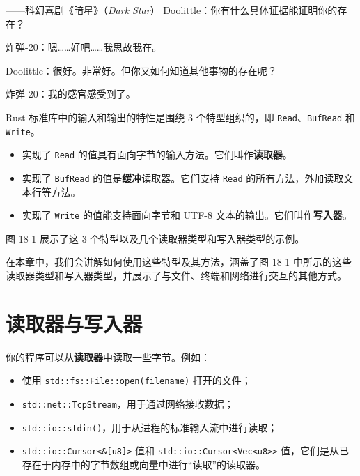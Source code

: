 
\begin{myEpigraph}{——科幻喜剧《暗星》（\emph{Dark Star}）}
Doolittle：你有什么具体证据能证明你的存在？

炸弹-20：嗯……好吧……我思故我在。

Doolittle：很好。非常好。但你又如何知道其他事物的存在呢？

炸弹-20：我的感官感受到了。
\end{myEpigraph}

Rust 标准库中的输入和输出的特性是围绕 3 个特型组织的，即 \texttt{Read}、\texttt{BufRead} 和 \texttt{Write}。

\begin{itemize}
\item 实现了 \texttt{Read} 的值具有面向字节的输入方法。它们叫作\textbf{读取器}。
\item 实现了 \texttt{BufRead} 的值是\textbf{缓冲}读取器。它们支持 \texttt{Read} 的所有方法，外加读取文本行等方法。
\item 实现了 \texttt{Write} 的值能支持面向字节和 UTF-8 文本的输出。它们叫作\textbf{写入器}。
\end{itemize}

图 18-1 展示了这 3 个特型以及几个读取器类型和写入器类型的示例。


在本章中，我们会讲解如何使用这些特型及其方法，涵盖了图 18-1 中所示的这些读取器类型和写入器类型，并展示了与文件、终端和网络进行交互的其他方式。

\section{读取器与写入器}

你的程序可以从\textbf{读取器}中读取一些字节。例如：

\begin{itemize}
\item 使用 \texttt{std::fs::File::open(filename)} 打开的文件；
\item \texttt{std::net::TcpStream}，用于通过网络接收数据；
\item \texttt{std::io::stdin()}，用于从进程的标准输入流中进行读取；
\item \texttt{std::io::Cursor<\&[u8]>} 值和 \texttt{std::io::Cursor<Vec<u8>>} 值，它们是从已存在于内存中的字节数组或向量中进行“读取”的读取器。
\end{itemize}

